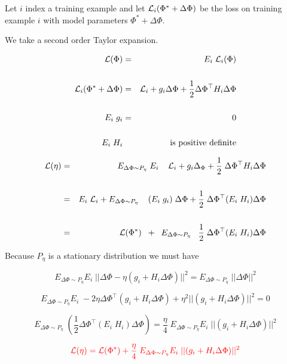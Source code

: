 {

\vfill
Let $i$ index a training example and let ${\cal L}_i(\Phi^* + \Delta \Phi)$ be the loss on training example $i$
with model parameters $\Phi^* + \Delta\Phi$. 

\vfill
We take a second order Taylor expansion.

\begin{eqnarray*}
{\cal L}(\Phi) & = & E_i\;{\cal L}_i(\Phi) \\
\\
{\cal L}_i(\Phi^* + \Delta \Phi) & = & {\cal L}_i + g_i \Delta \Phi + \frac{1}{2} \Delta\Phi^\top H_i \Delta\Phi \\
\\
E_i\; g_i & = & 0\\
\\
E_i\; H_i & & \mbox{is positive definite}
\end{eqnarray*}


\begin{eqnarray*}
{\cal L}(\eta) & = & \;\;\; E_{\Delta \Phi \sim P_\eta}\;E_i \;\;\;\; {\cal L}_i + g_i\Delta _\Phi + \frac{1}{2}\;\Delta \Phi^\top H_i \Delta \Phi \\
\\
& = & E_i\; {\cal L}_i + E_{\Delta \Phi \sim P_\eta} \;\;\;\;(E_i\;g_i) \;\Delta \Phi + \frac{1}{2}\;\Delta \Phi^\top (E_i\; H_i) \Delta \Phi \\
\\
& = & {\cal L}(\Phi^*)\;\; + \;\; E_{\Delta \Phi \sim P_\eta}\;\;\;\frac{1}{2}\;\Delta \Phi^\top (E_i\;H_i) \Delta \Phi
\end{eqnarray*}

Because $P_\eta$ is a stationary distribution we must have

$$E_{\Delta \Phi \sim P_\eta}E_i\; ||\Delta \Phi - \eta (g_i + H_i\Delta \Phi)||^2 = E_{\Delta \Phi \sim P_\eta}\; ||\Delta \Phi||^2$$

\vfill
$$E_{\Delta \Phi \sim P_\eta}E_i\;-2\eta \Delta \Phi^\top (g_i + H_i\Delta \Phi) +\eta^2||(g_i + H_i\Delta \Phi)||^2 = 0$$

\vfill
$$E_{\Delta \Phi \sim P_\eta}\;\left(\frac{1}{2}\Delta \Phi^\top (E_i \;H_i)\Delta \Phi\right) = \frac{\eta}{4}\;E_{\Delta \Phi \sim P_\eta}E_i \;||(g_i + H_i\Delta \Phi)||^2$$

\vfill
$${\color{red} {\cal L}(\eta)  = {\cal L}(\Phi^*) + \frac{\eta}{4}\;E_{\Delta \Phi \sim P_\eta}E_i \;||(g_i + H_i\Delta \Phi)||^2}$$

}
